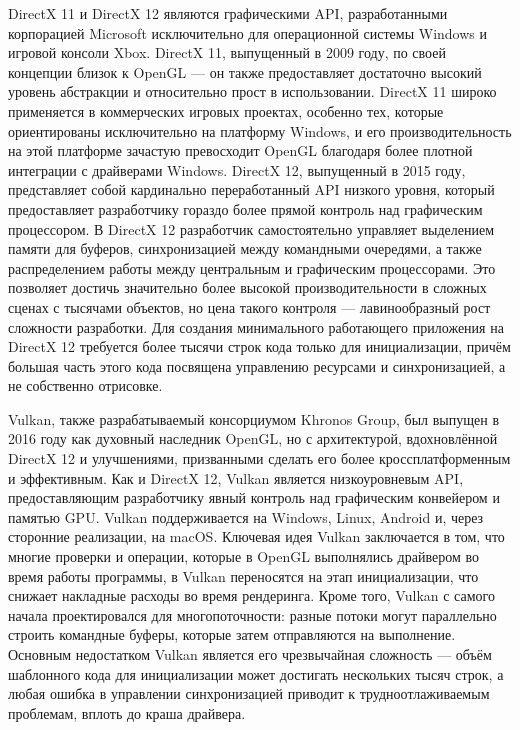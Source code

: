 DirectX 11 и DirectX 12 являются графическими API, разработанными корпорацией Microsoft исключительно для операционной системы Windows и игровой консоли Xbox. DirectX 11, выпущенный в 2009 году, по своей концепции близок к OpenGL — он также предоставляет достаточно высокий уровень абстракции и относительно прост в использовании. DirectX 11 широко применяется в коммерческих игровых проектах, особенно тех, которые ориентированы исключительно на платформу Windows, и его производительность на этой платформе зачастую превосходит OpenGL благодаря более плотной интеграции с драйверами Windows. DirectX 12, выпущенный в 2015 году, представляет собой кардинально переработанный API низкого уровня, который предоставляет разработчику гораздо более прямой контроль над графическим процессором. В DirectX 12 разработчик самостоятельно управляет выделением памяти для буферов, синхронизацией между командными очередями, а также распределением работы между центральным и графическим процессорами. Это позволяет достичь значительно более высокой производительности в сложных сценах с тысячами объектов, но цена такого контроля — лавинообразный рост сложности разработки. Для создания минимального работающего приложения на DirectX 12 требуется более тысячи строк кода только для инициализации, причём большая часть этого кода посвящена управлению ресурсами и синхронизацией, а не собственно отрисовке.

Vulkan, также разрабатываемый консорциумом Khronos Group, был выпущен в 2016 году как духовный наследник OpenGL, но с архитектурой, вдохновлённой DirectX 12 и улучшениями, призванными сделать его более кроссплатформенным и эффективным. Как и DirectX 12, Vulkan является низкоуровневым API, предоставляющим разработчику явный контроль над графическим конвейером и памятью GPU. Vulkan поддерживается на Windows, Linux, Android и, через сторонние реализации, на macOS. Ключевая идея Vulkan заключается в том, что многие проверки и операции, которые в OpenGL выполнялись драйвером во время работы программы, в Vulkan переносятся на этап инициализации, что снижает накладные расходы во время рендеринга. Кроме того, Vulkan с самого начала проектировался для многопоточности: разные потоки могут параллельно строить командные буферы, которые затем отправляются на выполнение. Основным недостатком Vulkan является его чрезвычайная сложность — объём шаблонного кода для инициализации может достигать нескольких тысяч строк, а любая ошибка в управлении синхронизацией приводит к трудноотлаживаемым проблемам, вплоть до краша драйвера.

